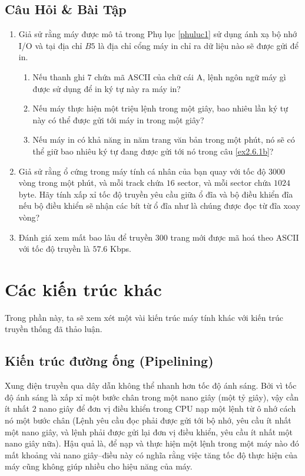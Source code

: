 \subsection*{Câu Hỏi \& Bài Tập}
\begin{enumerate}
\item Giả sử rằng máy được mô tả trong Phụ lục \ref{phuluc1} sử dụng ánh xạ bộ nhớ I/O và
  tại địa chỉ $B5$ là địa chỉ cổng máy in chỉ ra dữ liệu nào sẽ được gửi để in.
  \begin{enumerate}
  \item Nếu thanh ghi $7$ chứa mã ASCII của chữ cái A, lệnh ngôn ngữ máy gì được sử dụng
    để in ký tự này ra máy in?

  \item Nếu máy thực hiện một triệu lệnh trong một giây, bao nhiêu lần ký tự này có thể
    được gửi tới máy in trong một giây?
    \label{ex2.6.1b}

  \item Nếu máy in có khả năng in năm trang văn bản trong một phút, nó sẽ có thể giữ bao
    nhiêu ký tự đang được gửi tới nó trong câu \ref{ex2.6.1b}?
  \end{enumerate}

\item Giả sử rằng ổ cứng trong máy tính cá nhân của bạn quay với tốc độ $3000$ vòng trong
  một phút, và mỗi track chứa $16$ sector, và mỗi sector chứa $1024$ byte. Hãy tính xấp xỉ
  tốc độ truyền yêu cầu giữa ổ đĩa và bộ điều khiển đĩa nếu bộ điều khiển sẽ nhận các bít
  từ ổ đĩa như là chúng được đọc từ đĩa xoay vòng?

\item Đánh giá xem mất bao lâu để truyền $300$ trang mới được mã hoá theo ASCII với tốc độ
  truyền là $57.6$ Kbps.
\end{enumerate}

\section{Các kiến trúc khác}
Trong phần này, ta sẽ xem xét một vài kiến trúc máy tính khác với kiến trúc truyền
thống đã thảo luận.
 
\subsection*{Kiến trúc đường ống (Pipelining)}

Xung điện truyền qua dây dẫn không thể nhanh hơn tốc độ ánh sáng. Bởi vì tốc độ ánh sáng
là xấp xỉ một bước chân trong một nano giây (một tỷ giây), vậy cần ít nhất $2$ nano giây
để đơn vị điều khiển trong CPU nạp một lệnh từ ô nhớ cách nó một bước chân (Lệnh yêu cầu
đọc phải được gửi tới bộ nhớ, yêu cầu ít nhất một nano giây, và lệnh phải được gửi lại đơn
vị điều khiển, yêu cầu ít nhất một nano giây nữa). Hậu quả là, để nạp và thực hiện một
lệnh trong một máy nào đó mất khoảng vài nano giây--điều này có nghĩa rằng việc tăng tốc
độ thực hiện của máy cũng không giúp nhiều cho hiệu năng của máy.

